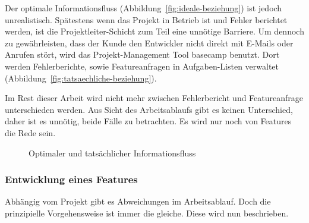 Der optimale Informationsfluss (Abbildung~\ref{fig:ideale-beziehung}) ist jedoch unrealistisch. Spätestens wenn das Projekt in Betrieb ist und Fehler berichtet werden, ist die Projektleiter-Schicht zum Teil eine unnötige Barriere. Um dennoch zu gewährleisten, dass der Kunde den Entwickler nicht direkt mit E-Mails oder Anrufen stört, wird das Projekt-Management Tool \Gls{basecamp} benutzt. Dort werden Fehlerberichte, sowie Featureanfragen in Aufgaben-Listen verwaltet (Abbildung~\ref{fig:tatsaechliche-beziehung}).

Im Rest dieser Arbeit wird nicht mehr zwischen Fehlerbericht und Featureanfrage unterschieden werden. Aus Sicht des Arbeitsablaufs gibt es keinen Unterschied, daher ist es unnötig, beide Fälle zu betrachten. Es wird nur noch von Features die Rede sein.

\begin{figure}
	\centering
	
	\caption{ Optimaler und  tatsächlicher Informationsfluss}
	\label{fig:personen_beziehungen}
\end{figure}


\subsubsection{Entwicklung eines Features} %
\label{ssub:entwicklung_eines_features}

Abhängig vom Projekt gibt es Abweichungen im Arbeitsablauf. Doch die prinzipielle Vorgehensweise ist immer die gleiche. Diese wird nun beschrieben.

